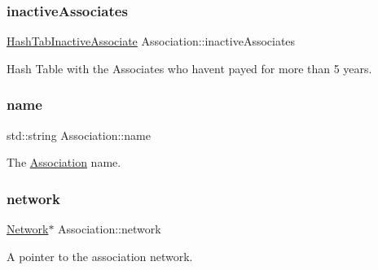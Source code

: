 \mbox{\label{classAssociation_a13bdee38cb61374825f440c6015f1846}} 
\subsubsection{\texorpdfstring{inactive\+Associates}{inactiveAssociates}}
{\footnotesize\ttfamily \mbox{\hyperlink{Association_8h_a867982abd2e9432d5bed2574754bad3c}{Hash\+Tab\+Inactive\+Associate}} Association\+::inactive\+Associates\hspace{0.3cm}{\ttfamily [private]}}



Hash Table with the Associates who haven\textquotesingle{}t payed for more than 5 years. 

\mbox{\label{classAssociation_a165477d8d99c99a659d2f193b39ba1f8}} 
\subsubsection{\texorpdfstring{name}{name}}
{\footnotesize\ttfamily std\+::string Association\+::name\hspace{0.3cm}{\ttfamily [private]}}



The \mbox{\hyperlink{classAssociation}{Association}} name. 

\mbox{\label{classAssociation_a6747cedd4ce14a3b890c8ac87f676192}} 
\subsubsection{\texorpdfstring{network}{network}}
{\footnotesize\ttfamily \mbox{\hyperlink{classNetwork}{Network}}$\ast$ Association\+::network\hspace{0.3cm}{\ttfamily [private]}}



A pointer to the association network. 

\mbox{\label{classAssociation_a22ce7b1ee683ccc41ac9aa2864744349}} 
